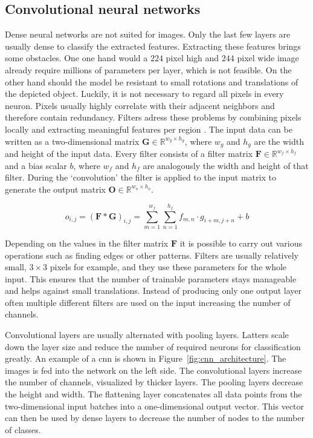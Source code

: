 \subsection{Convolutional neural networks}
Dense neural networks are not suited for images. Only the last few layers are usually dense to classify the extracted features. Extracting these features brings some obstacles. One one hand would a $224$ pixel high and $244$ pixel wide image already require millions of parameters per layer, which is not feasible. On the other hand should the model be resistant to small rotations and translations of the depicted object. Luckily, it is not necessary to regard all pixels in every neuron. Pixels usually highly correlate with their adjacent neighbors and therefore contain redundancy.
Filters adress these problems by combining pixels locally and extracting meaningful features per region \autocite{lecun1989}. The input data can be written as a two-dimensional matrix $\mathbf{G} \in \mathbb{R}^{w_g \times h_g}$, where $w_g$ and $h_g$ are the width and height of the input data. Every filter consists of a filter matrix $\mathbf{F} \in \mathbb{R}^{w_f \times h_f}$ and a bias scalar $b$, where $w_f$ and $h_f$ are analogously the width and height of that filter. During the `convolution' the filter is applied to the input matrix to generate the output matrix $\mathbf{O} \in \mathbb{R}^{w_o \times h_o}$.

\begin{equation}
o_{i,j} = (\mathbf{F} \ast \mathbf{G})_{i,j} = \sum_{m=1}^{w_f}\sum_{n=1}^{h_f} f_{m,n} \cdot g_{i+m, j+n} + b
\end{equation}

Depending on the values in the filter matrix $\mathbf{F}$ it is possible to carry out various operations such as finding edges or other patterns. 
Filters are usually relatively small, $3 \times 3$ pixels for example, and they use these parameters for the whole input. This ensures that the number of trainable parameters stays manageable and helps against small translations. 
Instead of producing only one output layer often multiple different filters are used on the input increasing the number of channels. 

Convolutional layers are usually alternated with pooling layers. Latters scale down the layer size and reduce the number of required neurons for classification greatly. An example of a \gls{cnn} is shown in Figure~\ref{fig:cnn_architecture}. The images is fed into the network on the left side. The convolutional layers increase the number of channels, visualized by thicker layers. The pooling layers decrease the height and width. The flattening layer concatenates all data points from the two-dimensional input batches into a one-dimensional output vector. This vector can then be used by dense layers to decrease the number of nodes to the number of classes.

